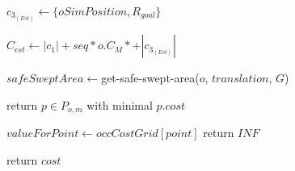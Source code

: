 \begin{algorithm}[H]
\begin{algorithmic}[1]
          \State {}

          \State $c_{3_{(Est)}} \gets \{oSimPosition, R_{goal}\}$

          \State $C_{est} \gets |c_{1}| + seq * o.C_{M} * $$ + |c_{3_{(Est)}}|$

          \State $safeSweptArea \gets $get-safe-swept-area($o$, $translation$, $G$)

        \EndWhile

      \EndFor

    \State return $p \in P_{o,m}$ with minimal $p.cost$

    \EndProcedure



        \State $valueForPoint \gets occCostGrid[point]$
          \State return $INF$
        \EndIf
      \EndFor

      \State return $cost$
    \EndProcedure

  \end{algorithmic}
\end{algorithm}
